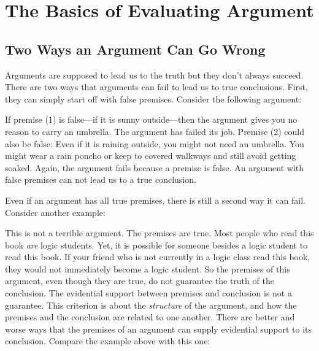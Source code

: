 \chapter{The Basics of Evaluating Argument} \label{ch:basicevaluation}


\section{Two Ways an Argument Can Go Wrong}\label{sec:two_ways}

Arguments are supposed to lead us to the truth but they don't always succeed. There are two ways that arguments can fail to lead us to true conclusions. First, they can simply start off with false premises. Consider the following argument:

\begin{kormanize}
\end{kormanize}

If premise (1) is false---if it is sunny outside---then the argument gives you no reason to carry an umbrella. The argument has failed its job. Premise (2) could also be false: Even if it is raining outside, you might not need an umbrella. You might wear a rain poncho or keep to covered walkways and still avoid getting soaked. Again, the argument fails because a premise is false. An argument with false premises can not lead us to a true conclusion.

Even if an argument has all true premises, there is still a second way it can fail. Consider another example:

\begin{kormanize}
\end{kormanize}

This is not a terrible argument. The premises are true. Most people who read this book \emph{are} logic students. Yet, it is possible for someone besides a logic student to read this book. If your friend who is not currently in a logic class read this book, they would not immediately become a logic student. So the premises of this argument, even though they are true, do not guarantee the truth of the conclusion. The evidential support between premises and conclusion is not a guarantee. This criterion is about the \emph{structure} of the argument, and how the premises and the conclusion are related to one another. There are better and worse ways that the premises of an argument can supply evidential support to its conclusion. Compare the example above with this one:

